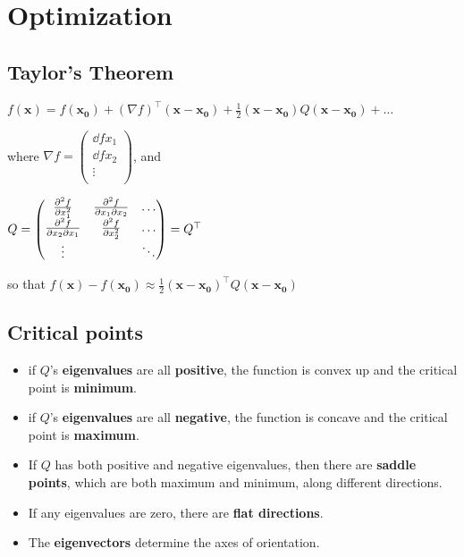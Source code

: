\section{Optimization}

\subsection{Taylor's Theorem}

$f(\pmb{x}) = f(\pmb{x_0}) + (\nabla f)^{\top}(\pmb{x-x_0}) +\frac{1}{2}(\pmb{x - x_0})Q(\pmb{x -x_0})+\ldots$

where $\nabla f = \begin{pmatrix}
    \dd{f}{x_1}\\
    \dd{f}{x_2}\\
    \vdots\\
\end{pmatrix}$, and

$Q=\begin{pmatrix}
    \frac{\partial^{2} f}{\partial x_1^{2}} & \frac{\partial^2 f}{\partial x_1 \partial x_2} & \ldots\\
    \frac{\partial^2 f}{\partial x_2 \partial x_1} & \frac{\partial^{2} f}{\partial x_2^{2}} & \ldots\\
    \vdots & & \ddots\\
\end{pmatrix} = Q^{\top}$ 

so that $f(\pmb{x}) - f(\pmb{x_0}) \approx \frac{1}{2}(\pmb{x -x_0})^{\top}Q(\pmb{x-x_0})$

\subsection{Critical points}
\begin{itemize}
    \item if $Q$'s \textbf{eigenvalues} are all \textbf{positive}, the function is convex up and the critical point is \textbf{minimum}.
    \item if $Q$'s \textbf{eigenvalues} are all \textbf{negative}, the function is concave and the critical point is \textbf{maximum}.
    \item If $Q$ has both positive and negative eigenvalues, then there are \textbf{saddle points}, which are both maximum and minimum, along different directions.
    \item If any eigenvalues are zero, there are \textbf{flat directions}.
    \item The \textbf{eigenvectors} determine the axes of orientation.
\end{itemize}

